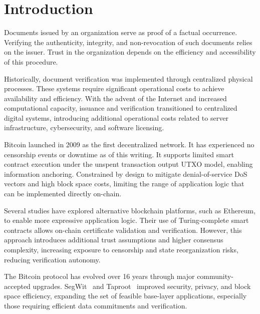\section{Introduction}

Documents issued by an organization serve as proof of a factual occurrence.
Verifying the authenticity, integrity, and non-revocation of such documents relies on the issuer.
Trust in the organization depends on the efficiency and accessibility of this procedure.

Historically, document verification was implemented through centralized physical processes.
These systems require significant operational costs to achieve availability and efficiency.
With the advent of the Internet and increased computational capacity, issuance and verification transitioned to centralized digital systems, introducing additional operational costs related to server infrastructure, cybersecurity, and software licensing.

Bitcoin launched in 2009 as the first decentralized network.
It has experienced no censorship events or downtime as of this writing.
It supports limited smart contract execution under the unspent transaction output UTXO model, enabling information anchoring.
Constrained by design to mitigate denial-of-service DoS vectors and high block space costs, limiting the range of application logic that can be implemented directly on-chain.

Several studies have explored alternative blockchain platforms, such as Ethereum, to enable more expressive application logic.
Their use of Turing-complete smart contracts allows on-chain certificate validation and verification.
However, this approach introduces additional trust assumptions and higher consensus complexity, increasing exposure to censorship and state reorganization risks, reducing verification autonomy.

The Bitcoin protocol has evolved over 16 years through major community-accepted upgrades.
SegWit~\cite{segwit} and Taproot~\cite{taproot} improved security, privacy, and block space efficiency, expanding the set of feasible base-layer applications, especially those requiring efficient data commitments and verification.